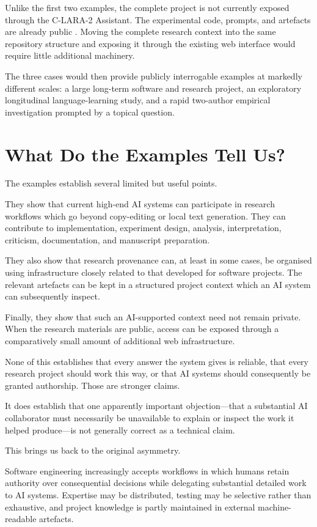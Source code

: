 Unlike the first two examples, the complete project is not currently exposed through the C-LARA-2 Assistant. The experimental code, prompts, and artefacts are already public \citep{raynerChatGPT2025grok}. Moving the complete research context into the same repository structure and exposing it through the existing web interface would require little additional machinery.

The three cases would then provide publicly interrogable examples at markedly different scales: a large long-term software and research project, an exploratory longitudinal language-learning study, and a rapid two-author empirical investigation prompted by a topical question.


\section{What Do the Examples Tell Us?}

The examples establish several limited but useful points.

They show that current high-end AI systems can participate in research workflows which go beyond copy-editing or local text generation. They can contribute to implementation, experiment design, analysis, interpretation, criticism, documentation, and manuscript preparation.

They also show that research provenance can, at least in some cases, be organised using infrastructure closely related to that developed for software projects. The relevant artefacts can be kept in a structured project context which an AI system can subsequently inspect.

Finally, they show that such an AI-supported context need not remain private. When the research materials are public, access can be exposed through a comparatively small amount of additional web infrastructure.

None of this establishes that every answer the system gives is reliable, that every research project should work this way, or that AI systems should consequently be granted authorship. Those are stronger claims.

It does establish that one apparently important objection---that a substantial AI collaborator must necessarily be unavailable to explain or inspect the work it helped produce---is not generally correct as a technical claim.

This brings us back to the original asymmetry.

Software engineering increasingly accepts workflows in which humans retain authority over consequential decisions while delegating substantial detailed work to AI systems. Expertise may be distributed, testing may be selective rather than exhaustive, and project knowledge is partly maintained in external machine-readable artefacts.

